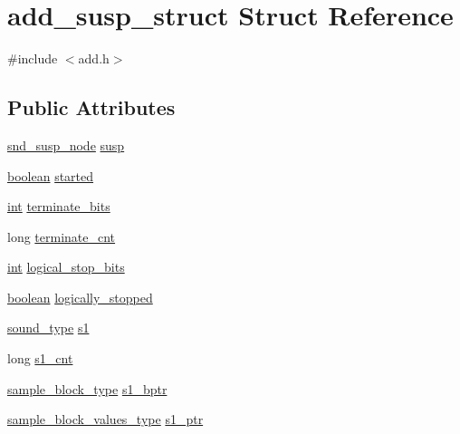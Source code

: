 \hypertarget{structadd__susp__struct}{}\section{add\+\_\+susp\+\_\+struct Struct Reference}
\label{structadd__susp__struct}


{\ttfamily \#include $<$add.\+h$>$}

\subsection*{Public Attributes}
\begin{DoxyCompactItemize}
\item 
\hyperlink{sound_8h_a6b268203688a934bd798ceb55f85d4c0}{snd\+\_\+susp\+\_\+node} \hyperlink{structadd__susp__struct_a255df2c7ef73db62cc2d14c51b8f900e}{susp}
\item 
\hyperlink{cext_8h_a7670a4e8a07d9ebb00411948b0bbf86d}{boolean} \hyperlink{structadd__susp__struct_a81e19df0bb1ba7f6227721cff4e1f3e9}{started}
\item 
\hyperlink{xmltok_8h_a5a0d4a5641ce434f1d23533f2b2e6653}{int} \hyperlink{structadd__susp__struct_a78af50c29188094959163a6c3b623b7c}{terminate\+\_\+bits}
\item 
long \hyperlink{structadd__susp__struct_a33fc23781d8a623c57f4b606f51ee757}{terminate\+\_\+cnt}
\item 
\hyperlink{xmltok_8h_a5a0d4a5641ce434f1d23533f2b2e6653}{int} \hyperlink{structadd__susp__struct_af9e04e08141e785c5096e214427c001e}{logical\+\_\+stop\+\_\+bits}
\item 
\hyperlink{cext_8h_a7670a4e8a07d9ebb00411948b0bbf86d}{boolean} \hyperlink{structadd__susp__struct_a6c8d8cbea2cb15d5e496a5ef8be8d955}{logically\+\_\+stopped}
\item 
\hyperlink{sound_8h_a792cec4ed9d6d636d342d9365ba265ea}{sound\+\_\+type} \hyperlink{structadd__susp__struct_a5696de2072e6f0c7500a1d9e9f00d4ed}{s1}
\item 
long \hyperlink{structadd__susp__struct_a29251ea236e564c0e4d9ed83bf16a004}{s1\+\_\+cnt}
\item 
\hyperlink{sound_8h_a6becaef7eb98c0e45b13f72dadf07b23}{sample\+\_\+block\+\_\+type} \hyperlink{structadd__susp__struct_a335718d2ab9af67d1b091ce9da057c59}{s1\+\_\+bptr}
\item 
\hyperlink{sound_8h_a83d17f7b465d1591f27cd28fc5eb8a03}{sample\+\_\+block\+\_\+values\+\_\+type} \hyperlink{structadd__susp__struct_a621a8acac0e8b8a1713e83f58a022b35}{s1\+\_\+ptr}

\end{DoxyCompactItemize}
